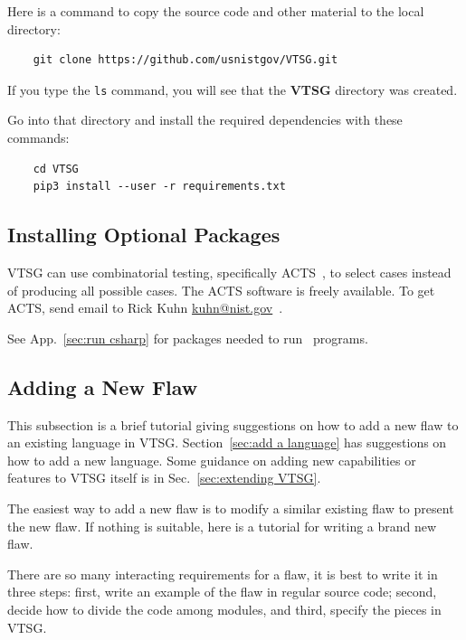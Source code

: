 \noindent Here is a command to copy the source code and other material to the local
directory:

\begin{verbatim}
    git clone https://github.com/usnistgov/VTSG.git
\end{verbatim}

\noindent If you type the \verb|ls| command, you will see that the \textbf{VTSG}
directory was created.

\noindent Go into that directory and install the required dependencies with these
commands:

\begin{verbatim}
    cd VTSG
    pip3 install --user -r requirements.txt
\end{verbatim}

\subsection{Installing Optional Packages}

VTSG can use combinatorial testing, specifically ACTS~\cite{ACTS2013}, to select
cases instead of producing all possible cases.  The ACTS software is freely available.
To get ACTS, send email to Rick Kuhn
\href{mailto:kuhn@nist.gov}{kuhn@nist.gov}~\cite{CombinTesting}.

See App.~\ref{sec:run csharp} for packages needed to run \CSharp\ programs.


\subsection{Adding a New Flaw}
\label{sec:adding a new flaw}

This subsection is a brief tutorial giving suggestions on how to add a new
flaw to an existing language in VTSG.  Section~\ref{sec:add a language} has
suggestions
on how to add a new language.  Some guidance on adding new capabilities or
features to VTSG itself is in Sec.~\ref{sec:extending VTSG}.

The easiest way to add a new flaw is to modify a similar existing flaw to present the
new flaw.  If nothing is suitable, here is a tutorial for writing a brand new flaw.

There are so many interacting requirements for a flaw, it is best to write it in
three steps: first, write an example of the flaw in regular source code; second,
decide how to
divide the code among modules, and third, specify the pieces in VTSG.

